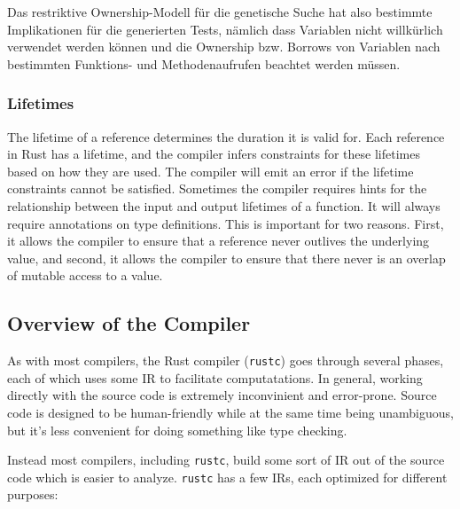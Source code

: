 \documentclass{article}
\begin{document}
Das restriktive Ownership-Modell für die genetische Suche hat also bestimmte Implikationen für die generierten Tests, nämlich dass Variablen nicht willkürlich verwendet werden können und die Ownership bzw. Borrows von Variablen nach bestimmten Funktions- und Methodenaufrufen beachtet werden müssen.

\subsubsection{Lifetimes}
The lifetime of a reference determines the duration it is valid for. Each reference in Rust has a lifetime, and the compiler infers constraints for these lifetimes based on how they are used. The compiler will emit an error if the lifetime constraints cannot be satisfied. Sometimes the compiler requires hints for the relationship between the input and output lifetimes of a function. It will always require annotations on type definitions. This is important for two reasons. First, it allows the compiler to ensure that a reference never outlives the underlying value, and second, it allows the compiler to ensure that there never is an overlap of mutable access to a value.

\newpage
\subsection{Overview of the Compiler}
As with most compilers, the Rust compiler (\lstinline{rustc}) goes through several phases, each of which uses some \ac{IR} to facilitate computatations. In general, working directly with the source code is extremely inconvinient and error-prone. Source code is designed to be human-friendly while at the same time being unambiguous, but it's less convenient for doing something like type checking.

Instead most compilers, including \lstinline{rustc}, build some sort of \ac{IR} out of the source code which is easier to analyze. \lstinline{rustc} has a few \acp{IR}, each optimized for different purposes:
\end{document}
